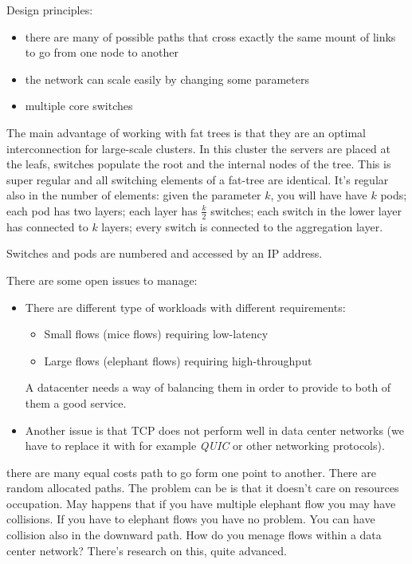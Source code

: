         Design principles:
        \begin{itemize}
            \item there are many of possible paths that cross exactly the same mount of links to go from one node to another
            \item the network can scale easily by changing some parameters
            \item multiple core switches
        \end{itemize}
        
        The main advantage of working with fat trees is that they are an optimal interconnection for large-scale clusters. In this cluster the servers are placed at the leafs, switches populate the root and the internal nodes of the tree. This is super regular and all switching elements of a fat-tree are identical.
        It's regular also in the number of elements: given the parameter $k$, you will have have $k$ pods; each pod has two layers; each layer has $\frac{k}{2}$ switches; each switch in the lower layer has connected to $k$ layers; every switch is connected to the aggregation layer. 
        
        Switches and pods are numbered and accessed by an IP address.
        
        There are some open issues to manage:
        \begin{itemize}
            \item There are different type of workloads with different requirements:
            \begin{itemize}
                \item Small flows (mice flows) requiring low-latency
                \item Large flows (elephant flows) requiring high-throughput
            \end{itemize}
            A datacenter needs a way of balancing them in order to provide to both of them a good service.
        
            \item Another issue is that TCP does not perform well in data center networks (we have to replace it with for example \textit{QUIC} or other networking protocols).
        \end{itemize}
        
        
        there are many equal costs path to go form one point to another. There are random allocated paths. The problem can be is that it doesn't care on resources occupation. May happens that if you have multiple elephant flow you may have collisions. If you have to elephant flows you have no problem. You can have collision also in the downward path. How do you menage flows within a data center network? There's research on this, quite advanced.
        
